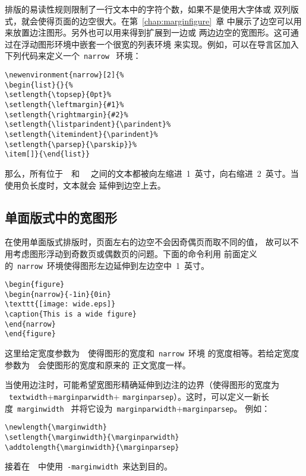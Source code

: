 排版的易读性规则限制了一行文本中的字符个数，如果不是使用大字体或
双列版式，就会使得页面的边空很大。在第~\ref{chap:marginfigure}~章
中展示了边空可以用来放置边注图形。另外也可以用来得到扩展到一边或
两边边空的宽图形。这可通过在浮动图形环境中嵌套一个很宽的列表环境
来实现。例如，可以在导言区加入下列代码来定义一个~\texttt{narrow}~
环境：
\begin{Verbatim}[xleftmargin=1cm]
\newenvironment{narrow}[2]{% 
\begin{list}{}{%
\setlength{\topsep}{0pt}% 
\setlength{\leftmargin}{#1}% 
\setlength{\rightmargin}{#2}% 
\setlength{\listparindent}{\parindent}% 
\setlength{\itemindent}{\parindent}% 
\setlength{\parsep}{\parskip}}% 
\item[]}{\end{list}}
\end{Verbatim}
那么，所有位于~~和~~
之间的文本都被向左缩进~1~英寸，向右缩进~2~英寸。当使用负长度时，文本就会
延伸到边空上去。

\clearpage

\subsection{单面版式中的宽图形}

在使用单面版式排版时，页面左右的边空不会因奇偶页而取不同的值，
故可以不用考虑图形浮动到奇数页或偶数页的问题。下面的命令利用
前面定义的~\texttt{narrow}~环境使得图形左边延伸到左边空中~1~英寸。
\begin{Verbatim}[xleftmargin=1cm]
\begin{figure} 
\begin{narrow}{-1in}{0in} 
\texttt{[image: wide.eps]} 
\caption{This is a wide figure} 
\end{narrow} 
\end{figure}
\end{Verbatim}

这里给定宽度参数为~~使得图形的宽度和~\texttt{narrow}~环境
的宽度相等。若给定宽度参数为~~会使图形的宽度和原来的
正文宽度一样。

当使用边注时，可能希望宽图形精确延伸到边注的边界（使得图形的宽度为
~\texttt{\bs textwidth}$+$\texttt{\bs marginparwidth}$+$%
\texttt{\bs marginparsep}）。这时，可以定义一新长度~\texttt{\bs marginwidth}~
并将它设为~\texttt{\bs marginparwidth}$+$\texttt{\bs marginparsep}。
例如：
\begin{Verbatim}[xleftmargin=1cm]
\newlength{\marginwidth} 
\setlength{\marginwidth}{\marginparwidth} 
\addtolength{\marginwidth}{\marginparsep}
\end{Verbatim}
接着在~~中使用~\texttt{-\bs marginwidth}~来达到目的。

